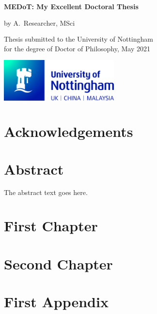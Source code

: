 \documentclass[11pt,a4paper,oneside]{report}
\begin{document}
\begin{titlepage}
    \centering

    \vspace*{1cm}
    \Huge
    \textbf{MEDoT: My Excellent Doctoral Thesis}

    \vspace{0.5cm}
    \LARGE
    by A.~Researcher, MSci

    \vfill
    \Large
    Thesis submitted to the University of Nottingham \\
    for the degree of Doctor of Philosophy, May 2021

    \vspace*{10mm}
    \includegraphics[width=60mm]{UoN_Primary_Logo_CMYK.jpg}
\end{titlepage}

\chapter*{Acknowledgements}


\tableofcontents
\listoffigures
\listoftables

\chapter*{Abstract}
The abstract text goes here.

\chapter{First Chapter}


\chapter{Second Chapter}



\printbibliography[title={References}]

\appendix

\chapter{First Appendix}

\end{document}
